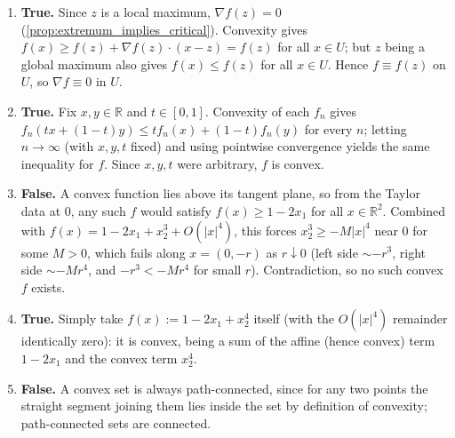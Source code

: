 \begin{exercisesolution}
\begin{enumerate}[label=\textbf{(\alph*)}]
    \begin{remark}
    Worth noting: $x=0$ here is simultaneously a (non-strict) local \emph{minimum} too, since $f$
    is locally constant on the whole region $\{x_1 \leq \tfrac12\} \cap U$. This is exactly why
    the counterexample doesn't contradict \textbf{(b)}: $x=0$ is not a \emph{global} maximum of
    $f$ on $U$ (any point with $x_1 > \tfrac12$ has $f$ strictly larger), so \textbf{(b)}'s
    stronger hypothesis simply isn't triggered.
    \end{remark}
  \item \textbf{True.} Since $z$ is a local maximum, $\nabla f(z) = 0$
    (\cref{prop:extremum_implies_critical}). Convexity gives $f(x) \geq f(z) + \nabla f(z)\cdot(x-z)
    = f(z)$ for all $x \in U$; but $z$ being a global maximum also gives $f(x) \leq f(z)$ for all
    $x \in U$. Hence $f \equiv f(z)$ on $U$, so $\nabla f \equiv 0$ in $U$.
  \item \textbf{True.} Fix $x, y \in \mathbb{R}$ and $t \in [0,1]$. Convexity of each $f_n$ gives
    $f_n(tx+(1-t)y) \leq tf_n(x) + (1-t)f_n(y)$ for every $n$; letting $n \to \infty$ (with
    $x,y,t$ fixed) and using pointwise convergence yields the same inequality for $f$. Since
    $x,y,t$ were arbitrary, $f$ is convex.
  \item \textbf{False.} A convex function lies above its tangent plane, so from the Taylor data at
    $0$, any such $f$ would satisfy $f(x) \geq 1-2x_1$ for all $x \in \mathbb{R}^2$. Combined with
    $f(x) = 1-2x_1+x_2^3+O(|x|^4)$, this forces $x_2^3 \geq -M|x|^4$ near $0$ for some $M>0$,
    which fails along $x = (0,-r)$ as $r \downarrow 0$ (left side $\sim -r^3$, right
    side $\sim -Mr^4$, and $-r^3 < -Mr^4$ for small $r$). Contradiction, so no such convex $f$
    exists.
  \item \textbf{True.} Simply take $f(x) := 1-2x_1+x_2^4$ itself (with the $O(|x|^4)$ remainder
    identically zero): it is convex, being a sum of the affine (hence convex) term $1-2x_1$ and
    the convex term $x_2^4$.
  \item \textbf{False.} A convex set is always path-connected, since for any two points the
    straight segment joining them lies inside the set by definition of convexity; path-connected
    sets are connected.
\end{enumerate}
\end{exercisesolution}

